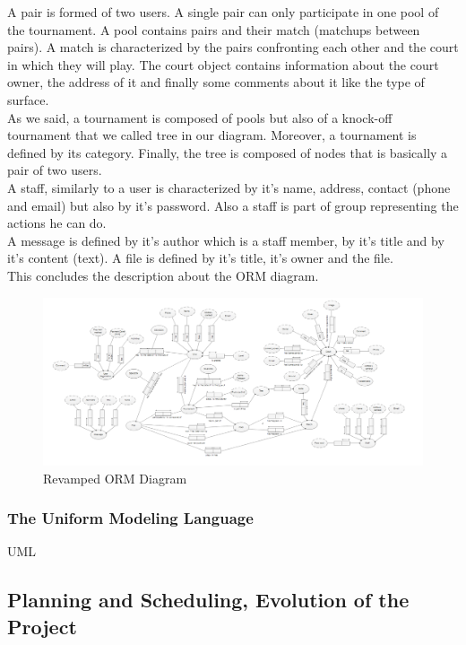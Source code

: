 \documentclass[a4paper, 12pt]{article}
\begin{document}
A pair is formed of two users. A single pair can only participate in one pool of the tournament. A pool contains pairs and their match (matchups between pairs). A match is characterized by the pairs confronting each other and the court in which they will play. The court object contains information about the court owner, the address of it and finally some comments about it like the type of surface.\\

As we said, a tournament is composed of pools but also of a knock-off tournament that we called tree in our diagram. Moreover, a tournament is defined by its category. Finally, the tree is composed of nodes that is basically a pair of two users.\\

A staff, similarly to a user is characterized by it's name, address, contact (phone and email) but also by it's password. Also a staff is part of group representing the actions he can do. \\

A message is defined by it's author which is a staff member, by it's title and by it's content (text). A file is defined by it's title, it's owner and the file.\\

This concludes the description about the ORM diagram. 

\begin{figure}[ht!]
\caption{\label{orm2} Revamped ORM Diagram}
\includegraphics[scale=0.58, angle=90]{ormp2.PNG}
\end{figure}
\FloatBarrier
\newpage

\subsubsection{The Uniform Modeling Language}
UML

\subsection{Planning and Scheduling, Evolution of the Project}
\end{document}
